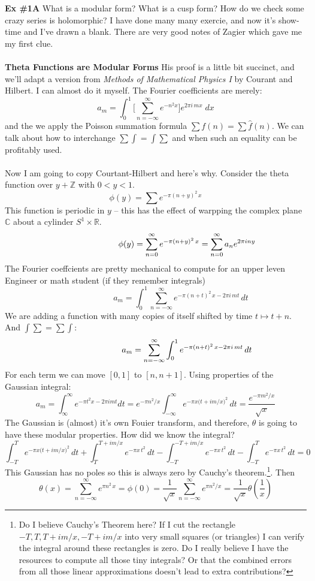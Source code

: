 \documentclass[12pt]{article}
\begin{document}
\noindent \textbf{Ex \#1A} What is a modular form?  What is a cusp form?  How do we check some crazy series is holomorphic?  I have done many many exercie, and now it's show-time and I've drawn a blank.  There are very good notes of Zagier which gave me my first clue. \\ \\
\textbf{Theta Functions are Modular Forms} His proof is a little bit succinct, and we'll adapt a version from \textit{Methods of Mathematical Physics I} by Courant and Hilbert.  I can almost do it myself.  The Fourier coefficients are merely:
$$ a_m = \int_0^1 \bigg[ \sum_{n = - \infty}^\infty e^{ - n^2 x} \bigg] e^{2\pi i \, m x} \; dx $$
and the we apply the Poisson summation formula $\sum f(n) = \sum \hat{f}(n)$.  We can talk about how to interchange $\sum \int = \int \sum$ and when such an equality can be profitably used.  \\ \\
Now I am going to copy Courtant-Hilbert and here's why.  Consider the theta function over $y + \mathbb{Z}$ with $0 < y < 1$.
$$\phi(y) = \sum e^{- \pi(n + y)^2 \, x}$$
This function is periodic in $y$ -- this has the effect of warpping the complex plane $\mathbb{C}$ about a cylinder $S^1 \times \mathbb{R}$.
$$ \hspace{1.04in}\phi(y) = \sum_{n =0}^\infty e^{- \pi(n + y)^2 \, x}
= \sum_{n =0}^\infty a_n e^{2\pi i n y}$$
The Fourier coeffcients are pretty mechanical to compute for an upper leven Engineer or math student (if they remember integrals)
$$ \hspace{1in} a_m = \int_0^1 \sum_{n = - \infty}^\infty e^{- \pi (n+t)^2 \, x - 2\pi i \, mt} \, dt $$
We are adding a function with many copies of itself shifted by  time $t \mapsto t + n$.  And $\int \sum = \sum \int$:
$$ \hspace{1.04in} a_m = \sum_{n = - \infty}^\infty \int_0^1 e^{- \pi (n+t)^2 \, x - 2\pi i \, mt} \, dt $$
For each term we can move $[0,1]$ to $[n, n+1]$.  Using properties of the Gaussian integral:
$$ a_m = \int_{\infty}^\infty e^{-\pi t^2 x - 2\pi i mt} dt = e^{-\pi n^2 / x}\int_{-\infty}^\infty e^{-\pi x \big(t + i m / x \big)^2} \, dt = \frac{e^{-\pi m^2 / x}}{\sqrt{x}}$$
The Gaussian is (almost) it's own Fouier transform, and therefore, $\theta$ is going to have these modular properties.  How did we know the integral?
$$ 
\int_{-T}^T e^{-\pi x \big(t + i m / x \big)^2} \, dt
+ \int_{T}^{T+im/x} e^{-\pi x \,t ^2} \, dt
- \int_{-T}^{-T+im/x} e^{-\pi x \,t ^2} \, dt
- \int_{-T}^T e^{-\pi x \,t^2} \, dt
= 0 $$
This Gaussian has no poles so this is always zero by Cauchy's theorem.\footnote{Do I believe Cauchy's Theorem here?  If I cut the rectangle $-T, T, T + im/x, -T + im/x $ into very small squares (or triangles) I can verify the integral around these rectangles is zero.  Do I really believe I have the resources to compute all those tiny integrals? Or that the combined errors from all those linear approximations doesn't lead to extra contributions?}.  Then
$$ \theta(x) = \sum_{n = - \infty}^\infty e^{\pi n^2 \, x}= \phi(0) = \frac{1}{\sqrt{x}}
\sum_{n = - \infty}^\infty e^{\pi n^2 / x}
= \frac{1}{\sqrt{x}} \theta(\frac{1}{x})$$
\end{document}
